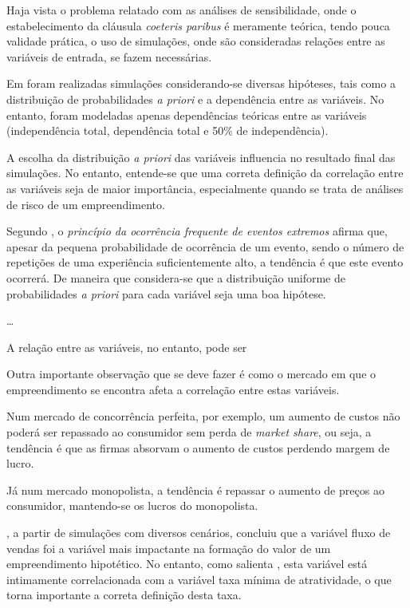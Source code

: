 \documentclass[
	12pt,				%
	oneside,			%
	a4paper,			%
	chapter=TITLE,		%
	section=TITLE,		%
	english,			%
	brazil				%
	]{abntex2}
\begin{document}
Haja vista o problema relatado com as análises de sensibilidade, onde o
estabelecimento da cláusula \emph{coeteris paribus} é meramente teórica, tendo
pouca validade prática, o uso de simulações, onde são consideradas relações
entre as variáveis de entrada, se fazem necessárias.

Em \textcite{gahochheim} foram realizadas simulações considerando-se diversas hipóteses,
tais como a distribuição de probabilidades \emph{a priori} e a dependência entre as
variáveis. No entanto, foram modeladas apenas dependências teóricas entre as
variáveis (independência total, dependência total e 50\% de independência).

A escolha da distribuição \emph{a priori} das variáveis influencia no resultado final
das simulações. No entanto, entende-se que uma correta definição da correlação
entre as variáveis seja de maior importância, especialmente quando se trata
de análises de risco de um empreendimento.

Segundo \textcite{matloff2017}, o \emph{princípio da ocorrência frequente de eventos extremos}
afirma que, apesar da pequena probabilidade de ocorrência de um evento, sendo
o número de repetições de uma experiência suficientemente alto, a tendência é
que este evento ocorrerá. De maneira que considera-se que a distribuição
uniforme de probabilidades \emph{a priori} para cada variável seja uma boa hipótese.

\ldots{}

A relação entre as variáveis, no entanto, pode ser

Outra importante observação que se deve fazer é como o mercado em que o
empreendimento se encontra afeta a correlação entre estas variáveis.

Num mercado de concorrência perfeita, por exemplo, um aumento de custos não
poderá ser repassado ao consumidor sem perda de \emph{market share}, ou seja, a
tendência é que as firmas absorvam o aumento de custos perdendo margem de lucro.

Já num mercado monopolista, a tendência é repassar o aumento de preços ao
consumidor, mantendo-se os lucros do monopolista.

\textcite{gahochheim}, a partir de simulações com diversos cenários, concluiu que a
variável fluxo de vendas foi a variável mais impactante na formação do valor
de um empreendimento hipotético. No entanto, como salienta \textcites{gahochheim}[119]{gahochheim}, esta variável está intimamente correlacionada com a
variável taxa mínima de atratividade, o que torna importante a correta definição
desta taxa.
\end{document}
